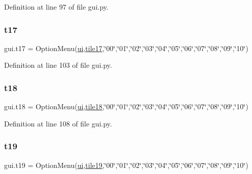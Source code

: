 Definition at line 97 of file gui.\+py.

\mbox{\label{namespacegui_a7e746bea37f63fd2a311fdc4083b5442}} 
\subsubsection{\texorpdfstring{t17}{t17}}
{\footnotesize\ttfamily gui.\+t17 = Option\+Menu(\mbox{\hyperlink{namespacegui_a40ab7281456eadbea2dc2038f5c24fa1}{ui}},\mbox{\hyperlink{namespacegui_aa98b8a15d8433c66120f88e562f8c2e8}{tile17}},\char`\"{}00\char`\"{},\char`\"{}01\char`\"{},\char`\"{}02\char`\"{},\char`\"{}03\char`\"{},\char`\"{}04\char`\"{},\char`\"{}05\char`\"{},\char`\"{}06\char`\"{},\char`\"{}07\char`\"{},\char`\"{}08\char`\"{},\char`\"{}09\char`\"{},\char`\"{}10\char`\"{})}



Definition at line 103 of file gui.\+py.

\mbox{\label{namespacegui_a231c57c39180acbf6e0a96db8a761894}} 
\subsubsection{\texorpdfstring{t18}{t18}}
{\footnotesize\ttfamily gui.\+t18 = Option\+Menu(\mbox{\hyperlink{namespacegui_a40ab7281456eadbea2dc2038f5c24fa1}{ui}},\mbox{\hyperlink{namespacegui_aabbaa4aef16bc80ffc978a99aa5d49bc}{tile18}},\char`\"{}00\char`\"{},\char`\"{}01\char`\"{},\char`\"{}02\char`\"{},\char`\"{}03\char`\"{},\char`\"{}04\char`\"{},\char`\"{}05\char`\"{},\char`\"{}06\char`\"{},\char`\"{}07\char`\"{},\char`\"{}08\char`\"{},\char`\"{}09\char`\"{},\char`\"{}10\char`\"{})}



Definition at line 108 of file gui.\+py.

\mbox{\label{namespacegui_a117c24cfee6369ee7d416f222b37a797}} 
\subsubsection{\texorpdfstring{t19}{t19}}
{\footnotesize\ttfamily gui.\+t19 = Option\+Menu(\mbox{\hyperlink{namespacegui_a40ab7281456eadbea2dc2038f5c24fa1}{ui}},\mbox{\hyperlink{namespacegui_a73e86c0a1db0de3424a7ca918dd92542}{tile19}},\char`\"{}00\char`\"{},\char`\"{}01\char`\"{},\char`\"{}02\char`\"{},\char`\"{}03\char`\"{},\char`\"{}04\char`\"{},\char`\"{}05\char`\"{},\char`\"{}06\char`\"{},\char`\"{}07\char`\"{},\char`\"{}08\char`\"{},\char`\"{}09\char`\"{},\char`\"{}10\char`\"{})}



